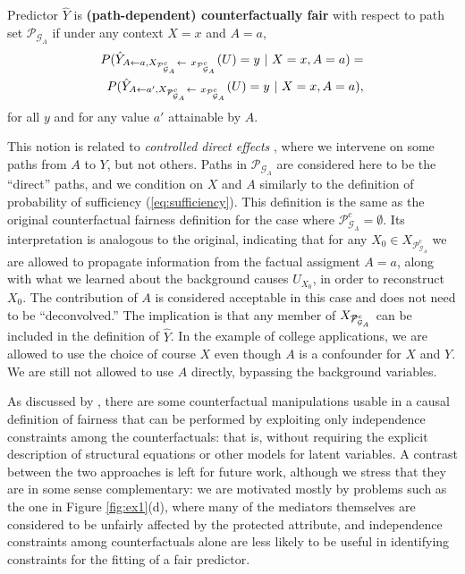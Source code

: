 \begin{define}
  Predictor $\hat Y$ is {\bf (path-dependent) counterfactually fair}
  with respect to path set $\mathcal P_{\mathcal G_A}$ if under any
  context $X = x$ and $A = a$,
  \label{eq:cf_definition}
\begin{align}
  P(\hat Y_{A \leftarrow a, X_{\mathcal P^c_{\mathcal G_A}} \leftarrow\ x_{\mathcal P^c_{\mathcal G_A}}}(U) = y\ |\ X = x, A = a)  =
  \nonumber\\ 
  P(\hat Y_{A \leftarrow a', X_{\not \mathcal P^c_{\mathcal G_A}} \leftarrow\ x_{ \mathcal P^c_{\mathcal G_A}}}(U) = y\ |\ X = x, A = a), 
\end{align}
for all $y$ and for any value $a'$ attainable by $A$.
\end{define}

This notion is related to {\it controlled direct effects}
\citep{pearl:16}, where we intervene on some paths from $A$ to $Y$,
but not others. Paths in $\mathcal P_{\mathcal G_A}$ are considered
here to be the ``direct'' paths, and we condition on $X$ and $A$
similarly to the definition of probability of sufficiency
(\ref{eq:sufficiency}). This definition is the same as the original
counterfactual fairness definition for the case where $\mathcal
P^c_{\mathcal G_A} = \emptyset$. Its interpretation is analogous to
the original, indicating that for any $X_0 \in X_{\mathcal
  P^c_{\mathcal G_A}}$ we are allowed to propagate information from
the factual assigment $A = a$, along with what we learned about the
background causes $U_{X_0}$, in order to reconstruct $X_0$. The
contribution of $A$ is considered acceptable in this case and does not
need to be ``deconvolved.''  The implication is that any member of
$X_{\not \mathcal P^c_{\mathcal G_A}}$ can be included in the
definition of $\hat Y$. In the example of college applications, we are
allowed to use the choice of course $X$ even though $A$ is a
confounder for $X$ and $Y$. We are still not allowed to use $A$
directly, bypassing the background variables.

As discussed by \cite{nabi:17}, there are some counterfactual
manipulations usable in a causal definition of fairness that can be
performed by exploiting only independence constraints among the
counterfactuals: that is, without requiring the explicit description
of structural equations or other models for latent variables. A
contrast between the two approaches is left for future work, although
we stress that they are in some sense complementary: we are motivated
mostly by problems such as the one in Figure \ref{fig:ex1}(d), where
many of the mediators themselves are considered to be unfairly
affected by the protected attribute, and independence constraints
among counterfactuals alone are less likely to be useful in
identifying constraints for the fitting of a fair predictor.


